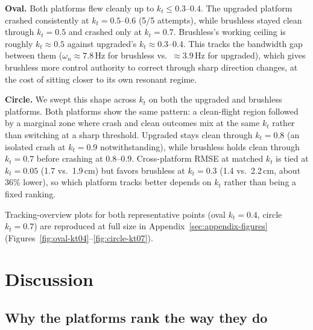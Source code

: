 \documentclass[11pt,a4paper]{article}
\begin{document}
\textbf{Oval.} Both platforms flew cleanly up to $k_t\le0.3$--$0.4$. The upgraded platform
crashed consistently at $k_t=0.5$--$0.6$ (5/5 attempts), while brushless stayed clean through
$k_t=0.5$ and crashed only at $k_t=0.7$. Brushless's working ceiling is roughly $k_t\approx0.5$
against upgraded's $k_t\approx0.3$--$0.4$. This tracks the bandwidth gap between them
($\omega_n\approx7.8\,\mathrm{Hz}$ for brushless vs.\ $\approx3.9\,\mathrm{Hz}$ for upgraded),
which gives brushless more control authority to correct through sharp direction changes, at the
cost of sitting closer to its own resonant regime.

\textbf{Circle.} We swept this shape across $k_t$ on both the upgraded and brushless platforms.
Both platforms show the same pattern: a clean-flight region followed
by a marginal zone where crash and clean outcomes mix at the same $k_t$ rather than switching at
a sharp threshold. Upgraded stays clean through $k_t=0.8$ (an isolated crash at $k_t=0.9$ notwithstanding), while
brushless holds clean through $k_t=0.7$ before crashing at $0.8$--$0.9$. Cross-platform RMSE at
matched $k_t$ is tied at $k_t=0.05$ (1.7 vs.\
1.9\,cm) but favors brushless at $k_t=0.3$ (1.4 vs.\ 2.2\,cm, about 36\% lower), so which platform
tracks better depends on $k_t$ rather than being a fixed ranking.

Tracking-overview plots for both representative points (oval $k_t=0.4$, circle $k_t=0.7$) are
reproduced at full size in Appendix~\ref{sec:appendix-figures}
(Figures~\ref{fig:oval-kt04}--\ref{fig:circle-kt07}).

\section{Discussion}

\subsection{Why the platforms rank the way they do}
\end{document}
